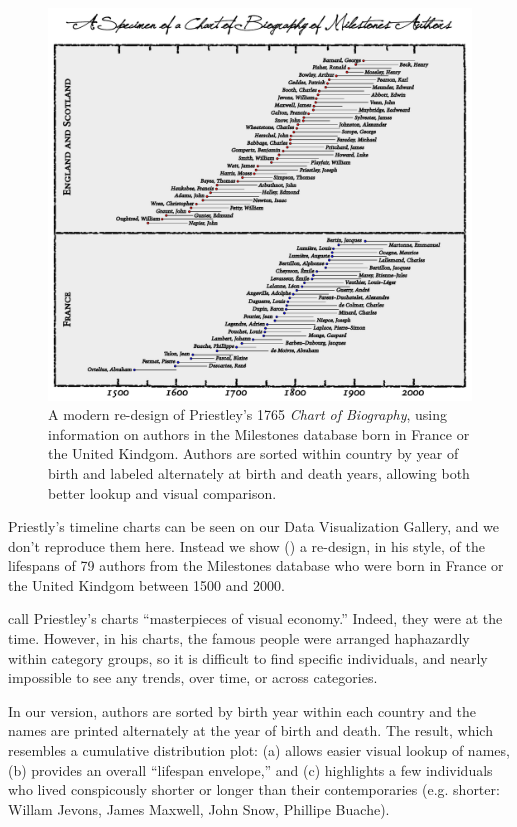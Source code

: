 \begin{figure}[!htb]
  \centering
  \includegraphics[width=.85\textwidth,clip]{fig/timespan}
  \caption{A modern re-design of Priestley's 1765 \emph{Chart of Biography},
  using information on authors in the Milestones database born in France or the
  United Kindgom. Authors are sorted within country by year of birth and labeled
  alternately at birth and death years, allowing both better lookup and visual
  comparison.
  }
  \label{fig:timespan}
\end{figure}

Priestly's timeline charts can be seen on our Data Visualization Gallery, and we don't reproduce
them here.  Instead we show () a re-design, in his style, of the lifespans
of 79 authors from the Milestones database who were born in France or the United Kindgom between
1500 and 2000. 

\citet[p. 117]{RosenbergGrafton:2010} call Priestley's charts ``masterpieces of visual economy.''
Indeed, they were at the time.  However, in his charts, the famous people were arranged 
haphazardly within category groups, so it is difficult to find specific individuals, 
and nearly impossible to see any trends, over time, or across categories. 

In our version, authors are sorted by birth year within each country and the names are printed
alternately at the year of birth and death. The result, which resembles a cumulative distribution
plot: (a) allows easier visual lookup of names, (b) provides an overall ``lifespan envelope,''
and (c) highlights a few individuals who lived conspicously shorter or longer than their
contemporaries (e.g. shorter: Willam Jevons,  James Maxwell, John Snow, Phillipe Buache).

